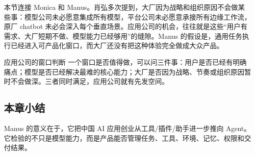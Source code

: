 本节连接 Monica 和 Manus。肖弘多次提到，大厂因为战略和组织原因不会做某些事：模型公司未必愿意集成所有模型，平台公司未必愿意承接所有边缘工作流，原厂 chatbot 未必会深入每个垂直场景。应用公司的机会，往往就是这些“用户有需求、大厂短期不做、模型能力已经够用”的缝隙。Manus 的假设是，通用任务执行已经进入可产品化窗口，而大厂还没有把这种体验完全做成大众产品。

\begin{importantbox}{应用公司的窗口判断}
一个窗口是否值得做，可以问三件事：用户是否已经有明确痛点；模型是否已经解决最难的核心能力；大厂是否因为战略、节奏或组织原因暂时不会做深。三者同时满足，应用公司就有先发空间。
\end{importantbox}

\subsection{本章小结}

Manus 的意义在于，它把中国 AI 应用创业从工具/插件/助手进一步推向 Agent。它检验的不只是模型能力，而是产品能否管理任务、工具、环境、记忆、权限和交付结果。


